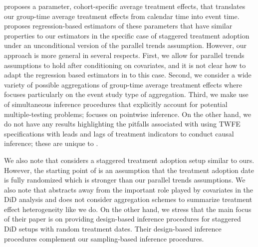 \documentclass[11pt]{article}%
\theoremstyle{plain}
\numberwithin{sassumption}{section}
\numberwithin{equation}{section}
\begin{document}
\cite{Abraham2018} proposes a parameter, cohort-specific average treatment
effects, that translates our group-time average treatment effects from
calendar time into event time. \cite{Abraham2018} proposes regression-based
estimators of these parameters that have similar properties to our estimators
in the specific case of staggered treatment adoption under an unconditional
version of the parallel trends assumption. However, our approach is more
general in several respects. First, we allow for parallel trends assumptions
to hold after conditioning on covariates, and it is not clear how to adapt the
regression based estimators in \cite{Abraham2018} to this case. Second, we
consider a wide variety of possible aggregations of group-time average
treatment effects where \cite{Abraham2018} focuses particularly on the event
study type of aggregation. Third, we make use of simultaneous inference
procedures that explicitly account for potential multiple-testing problems;
\cite{Abraham2018} focuses on pointwise inference. On the other hand, we do
not have any results highlighting the pitfalls associated with using TWFE
specifications with leads and lags of treatment indicators to conduct causal
inference; these are unique to \cite{Abraham2018}.



We also note that \cite{Athey2018} considers a staggered treatment adoption
setup similar to ours. However, the starting point of \cite{Athey2018} is an
assumption that the treatment adoption date is fully randomized which is
stronger than our parallel trends assumptions. We also note that
\cite{Athey2018} abstracts away from the important role played by covariates
in the DiD analysis and does not consider aggregation schemes to summarize
treatment effect heterogeneity like we do. On the other hand, we stress that
the main focus of their paper is on providing design-based inference
procedures for staggered DiD setups with random treatment dates. Their
design-based inference procedures complement our sampling-based inference
procedures. \bigskip
\end{document}
